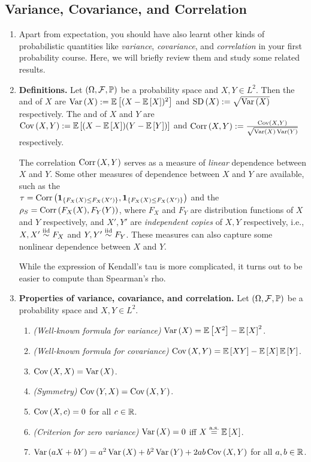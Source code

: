 \subsection{Variance, Covariance, and Correlation}
\begin{enumerate}
\item Apart from expectation, you should have also learnt other kinds of
probabilistic quantities like \emph{variance}, \emph{covariance}, and
\emph{correlation} in your first probability course. Here, we will briefly
review them and study some related results.
\item \textbf{Definitions.} Let \((\Omega,\mathcal{F},\mathbb{P})\) be a probability
space and \(X,Y\in L^2\). Then the  and  of \(X\) are \(\operatorname{Var}\left(X\right):=\mathbb{E}\left[(X-\mathbb{E}\left[X\right])^{2}\right]\) and
\(\operatorname{SD}\left(X\right):=\sqrt{\operatorname{Var}\left(X\right)}\) respectively. The  and 
of \(X\) and \(Y\) are \(\operatorname{Cov}\left(X,Y\right):=\mathbb{E}\left[(X-\mathbb{E}\left[X\right])(Y-\mathbb{E}\left[Y\right])\right]\) and
\(\operatorname{Corr}\left(X,Y\right):=\frac{\operatorname{Cov}\left(X,Y\right)}{\sqrt{\operatorname{Var}\left(X\right)\operatorname{Var}\left(Y\right)}}\) respectively.

\begin{note}
The correlation \(\operatorname{Corr}\left(X,Y\right)\) serves as a measure of \emph{linear} dependence
between \(X\) and \(Y\). Some other measures of dependence between \(X\) and
\(Y\) are available, such as the  \\
\(\tau=\operatorname{Corr}\left(\mathbf{1}_{\left\{F_X(X)\le F_X(X')\right\}},\mathbf{1}_{\left\{F_X(X)\le F_X(X')\right\}}\right)\)
and the  \(\rho_S=\operatorname{Corr}\left(F_X(X),F_Y(Y)\right)\), where \(F_X\)
and \(F_Y\) are distribution functions of \(X\) and \(Y\) respectively, and
\(X',Y'\) are \emph{independent copies} of \(X,Y\) respectively, i.e.,
\(X,X'\overset{\text{iid}}\sim F_X\) and \(Y,Y'\overset{\text{iid}}\sim F_Y\). These measures can also capture some
nonlinear dependence between \(X\) and \(Y\).

While the expression of Kendall's tau is more complicated, it turns out to be
easier to compute than Spearman's rho.
\end{note}
\item\label{it:var-cov-corr-prop} \textbf{Properties of variance, covariance,
and correlation.} Let \((\Omega,\mathcal{F},\mathbb{P})\) be a probability space and
\(X,Y\in L^2\).
\begin{enumerate}
\item \emph{(Well-known formula for variance)} \(\operatorname{Var}\left(X\right)=\mathbb{E}\left[X^{2}\right]-\mathbb{E}\left[X\right]^{2}\).
\item \emph{(Well-known formula for covariance)} \(\operatorname{Cov}\left(X,Y\right)=\mathbb{E}\left[XY\right]-\mathbb{E}\left[X\right]\mathbb{E}\left[Y\right]\).
\item \(\operatorname{Cov}\left(X,X\right)=\operatorname{Var}\left(X\right)\).
\item \emph{(Symmetry)} \(\operatorname{Cov}\left(Y,X\right)=\operatorname{Cov}\left(X,Y\right)\).
\item \(\operatorname{Cov}\left(X,c\right)=0\) for all \(c\in\mathbb{R}\).
\item \emph{(Criterion for zero variance)} \(\operatorname{Var}\left(X\right)=0\) iff \(X\overset{\text{a.s.}}= \mathbb{E}\left[X\right]\).
\item \(\operatorname{Var}\left(aX+bY\right)=a^{2}\operatorname{Var}\left(X\right)+b^{2}\operatorname{Var}\left(Y\right)+2ab\operatorname{Cov}\left(X,Y\right)\) for all \(a,b\in\mathbb{R}\).


\end{enumerate}
\end{enumerate}
